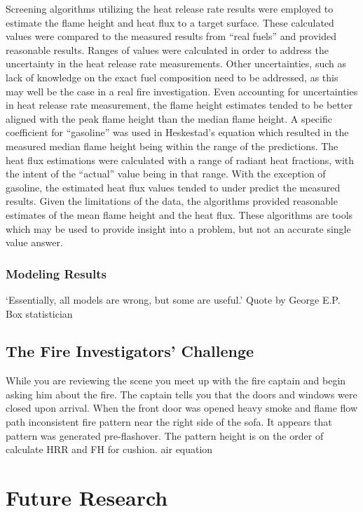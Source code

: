 \documentclass[twoside]{uocthesis}
\begin{document}
{Screening algorithms utilizing the heat release rate results were employed to estimate the flame height and heat flux to a target surface.  These calculated values were compared to the measured results from “real fuels” and provided reasonable results.  Ranges of values were calculated in order to address the uncertainty in the heat release rate measurements.  Other uncertainties, such as lack of knowledge on the exact fuel composition need to be addressed, as this may well be the case in a real fire investigation.  Even accounting for uncertainties in heat release rate measurement, the flame height estimates tended to be better aligned with the peak flame height than the median flame height.  A specific coefficient for “gasoline” was used in Heskestad’s equation which resulted in the measured median flame height being within the range of the predictions.  The heat flux estimations were calculated with a range of radiant heat fractions, with the intent of the “actual” value being in that range.  With the exception of gasoline, the estimated heat flux values tended to under predict the measured results.  Given the limitations of the data, the algorithms provided reasonable estimates of the mean flame height and the heat flux.  These algorithms are tools which may be used to provide insight into a problem, but not an accurate single value answer. 

\subsection{Modeling Results}

`Essentially, all models are wrong, but some are useful.'   Quote by George E.P. Box  statistician


\section{The Fire Investigators' Challenge}

While you are reviewing the scene you meet up with the fire captain and begin asking him about the fire.  The captain tells you that the doors and windows were closed upon arrival.  When the front door was opened heavy smoke and flame 
flow path
inconsistent fire pattern near the right side of the sofa.  It appears that pattern was generated pre-flashover.  The pattern height is on the order of   calculate HRR and FH for cushion.
air equation

\chapter{Future Research}

}
\end{document}
